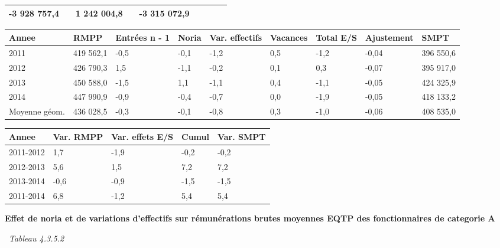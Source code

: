 \begin{longtable}[]{@{}lllllllll@{}}
\begin{minipage}[t]{0.16\columnwidth}
-3 928 757,4\strut
\end{minipage} & \begin{minipage}[t]{0.06\columnwidth}\raggedright
\strut
\end{minipage} & \begin{minipage}[t]{0.12\columnwidth}\raggedright
1 242 004,8\strut
\end{minipage} & \begin{minipage}[t]{0.06\columnwidth}\raggedright
\strut
\end{minipage} & \begin{minipage}[t]{0.10\columnwidth}\raggedright
-3 315 072,9\strut
\end{minipage} & \begin{minipage}[t]{0.06\columnwidth}\raggedright
\strut
\end{minipage}\tabularnewline
\bottomrule
\end{longtable}

\begin{longtable}[]{@{}lllllllll@{}}
\toprule
Annee & RMPP & Entrées n - 1 & Noria & Var. effectifs & Vacances & Total
E/S & Ajustement & SMPT\tabularnewline
\midrule
\endhead
2011 & 419 562,1 & -0,5 & -0,1 & -1,2 & 0,5 & -1,2 & -0,04 & 396
550,6\tabularnewline
2012 & 426 790,3 & 1,5 & -1,1 & -0,2 & 0,1 & 0,3 & -0,07 & 395
917,0\tabularnewline
2013 & 450 588,0 & -1,5 & 1,1 & -1,1 & 0,4 & -1,1 & -0,05 & 424
325,9\tabularnewline
2014 & 447 990,9 & -0,9 & -0,4 & -0,7 & 0,0 & -1,9 & -0,05 & 418
133,2\tabularnewline
Moyenne géom. & 436 028,5 & -0,3 & -0,1 & -0,8 & 0,3 & -1,0 & -0,06 &
408 535,0\tabularnewline
\bottomrule
\end{longtable}

\begin{longtable}[]{@{}lllll@{}}
\toprule
Annee & Var. RMPP & Var. effets E/S & Cumul & Var. SMPT\tabularnewline
\midrule
\endhead
2011-2012 & 1,7 & -1,9 & -0,2 & -0,2\tabularnewline
2012-2013 & 5,6 & 1,5 & 7,2 & 7,2\tabularnewline
2013-2014 & -0,6 & -0,9 & -1,5 & -1,5\tabularnewline
2011-2014 & 6,8 & -1,2 & 5,4 & 5,4\tabularnewline
\bottomrule
\end{longtable}

\textbf{Effet de noria et de variations d'effectifs sur rémunérations
brutes moyennes EQTP des fonctionnaires de categorie A}

~\emph{Tableau 4.3.5.2}

